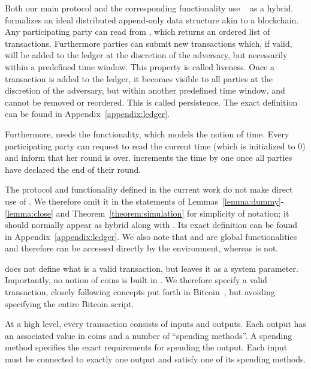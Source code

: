     Both our main protocol and the corresponding functionality use
    \ledger~\cite{BMTZ17,genesis} as a hybrid. \ledger{} formalizes an ideal
    distributed append-only data structure akin to a blockchain. Any
    participating party can read from \ledger, which returns an ordered list
    of transactions. Furthermore parties can submit new transactions which, if
    valid, will be added to the ledger at the discretion of the adversary, but
    necessarily within a predefined time window. This property is called
    liveness. Once a transaction is added to the ledger, it becomes visible to
    all parties at the discretion of the adversary, but within another
    predefined time window, and cannot be removed or reordered. This is called
    persistence. The exact definition can be found in
    Appendix~\ref{appendix:ledger}.

    Furthermore, \ledger{} needs the \Fclock functionality, which models the
    notion of time. Every participating party can request to read the current
    time (which is initialized to 0) and inform \Fclock that her round is over.
    \Fclock increments the time by one once all parties have declared the end of
    their round.

    The protocol and functionality defined in the current work do not make
    direct use of \Fclock. We therefore omit it in the statements of
    Lemmas~\ref{lemma:dummy}-\ref{lemma:close} and
    Theorem~\ref{theorem:simulation} for simplicity of notation; it should
    normally appear as hybrid along with \ledger. Its exact definition can be
    found in Appendix~\ref{appendix:ledger}. We also note that \ledger{} and
    \Fclock are global functionalities~\cite{globaluc} and therefore can be
    accessed directly by the environment, whereas \fpaynet{} is not.

    \ledger{} does not define what is a valid transaction, but leaves it as a
    system parameter. Importantly, no notion of coins is built in \ledger. We
    therefore specify a valid transaction, closely following concepts put forth
    in Bitcoin~\cite{bitcoin}, but avoiding specifying the entire Bitcoin
    script.

    At a high level, every transaction consists of inputs and outputs. Each
    output has an associated value in coins and a number of ``spending
    methods''. A spending method specifies the exact requirements for spending
    the output. Each input must be connected to exactly one output and satisfy
    one of its spending methods.

